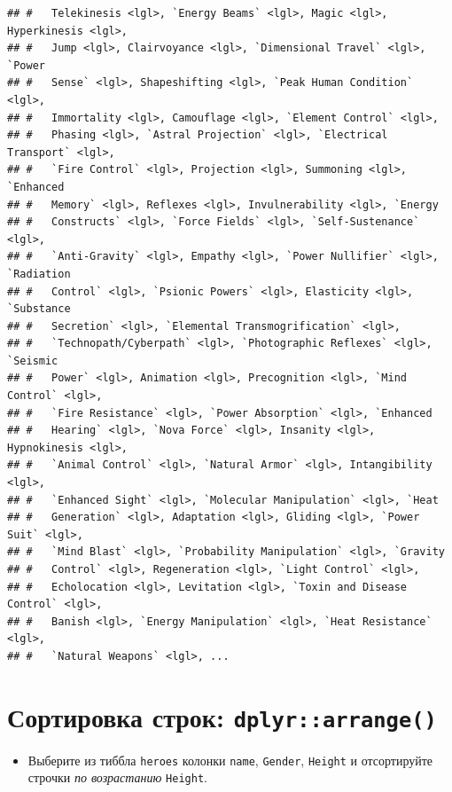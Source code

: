 \documentclass[]{book}
\newenvironment{Shaded}{\begin{snugshade}}{\end{snugshade}}
\newcommand{\KeywordTok}[1]{\textcolor[rgb]{0.13,0.29,0.53}{\textbf{#1}}}
\newcommand{\StringTok}[1]{\textcolor[rgb]{0.31,0.60,0.02}{#1}}
\newcommand{\OperatorTok}[1]{\textcolor[rgb]{0.81,0.36,0.00}{\textbf{#1}}}
\newcommand{\NormalTok}[1]{#1}
\providecommand{\tightlist}{%
  \setlength{\itemsep}{0pt}\setlength{\parskip}{0pt}}
\begin{document}
\begin{verbatim}
## #   Telekinesis <lgl>, `Energy Beams` <lgl>, Magic <lgl>, Hyperkinesis <lgl>,
## #   Jump <lgl>, Clairvoyance <lgl>, `Dimensional Travel` <lgl>, `Power
## #   Sense` <lgl>, Shapeshifting <lgl>, `Peak Human Condition` <lgl>,
## #   Immortality <lgl>, Camouflage <lgl>, `Element Control` <lgl>,
## #   Phasing <lgl>, `Astral Projection` <lgl>, `Electrical Transport` <lgl>,
## #   `Fire Control` <lgl>, Projection <lgl>, Summoning <lgl>, `Enhanced
## #   Memory` <lgl>, Reflexes <lgl>, Invulnerability <lgl>, `Energy
## #   Constructs` <lgl>, `Force Fields` <lgl>, `Self-Sustenance` <lgl>,
## #   `Anti-Gravity` <lgl>, Empathy <lgl>, `Power Nullifier` <lgl>, `Radiation
## #   Control` <lgl>, `Psionic Powers` <lgl>, Elasticity <lgl>, `Substance
## #   Secretion` <lgl>, `Elemental Transmogrification` <lgl>,
## #   `Technopath/Cyberpath` <lgl>, `Photographic Reflexes` <lgl>, `Seismic
## #   Power` <lgl>, Animation <lgl>, Precognition <lgl>, `Mind Control` <lgl>,
## #   `Fire Resistance` <lgl>, `Power Absorption` <lgl>, `Enhanced
## #   Hearing` <lgl>, `Nova Force` <lgl>, Insanity <lgl>, Hypnokinesis <lgl>,
## #   `Animal Control` <lgl>, `Natural Armor` <lgl>, Intangibility <lgl>,
## #   `Enhanced Sight` <lgl>, `Molecular Manipulation` <lgl>, `Heat
## #   Generation` <lgl>, Adaptation <lgl>, Gliding <lgl>, `Power Suit` <lgl>,
## #   `Mind Blast` <lgl>, `Probability Manipulation` <lgl>, `Gravity
## #   Control` <lgl>, Regeneration <lgl>, `Light Control` <lgl>,
## #   Echolocation <lgl>, Levitation <lgl>, `Toxin and Disease Control` <lgl>,
## #   Banish <lgl>, `Energy Manipulation` <lgl>, `Heat Resistance` <lgl>,
## #   `Natural Weapons` <lgl>, ...
\end{verbatim}

\section{\texorpdfstring{Сортировка строк:
\texttt{dplyr::arrange()}}{Сортировка строк: dplyr::arrange()}}\label{solution_arr}

\begin{itemize}
\tightlist
\item
  Выберите из тиббла \texttt{heroes} колонки \texttt{name},
  \texttt{Gender}, \texttt{Height} и отсортируйте строчки \emph{по
  возрастанию} \texttt{Height}.
\end{itemize}

\begin{Shaded}
\end{Shaded}
\end{document}
